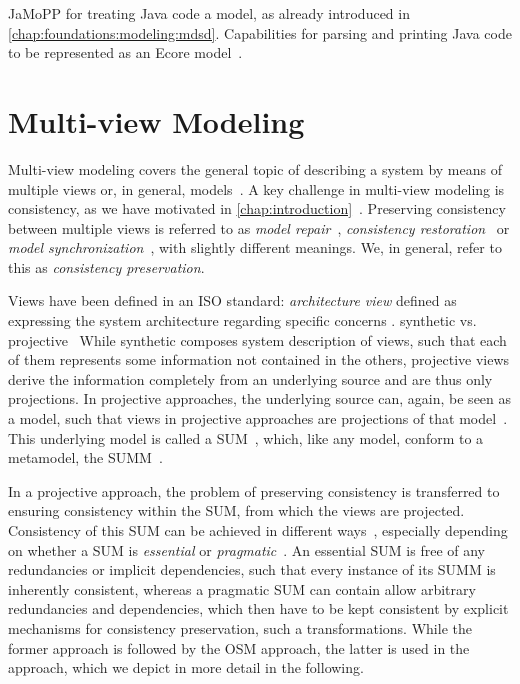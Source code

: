 JaMoPP for treating Java code a model, as already introduced in \autoref{chap:foundations:modeling:mdsd}.
Capabilities for parsing and printing Java code to be represented as an Ecore model~\cite{heidenreich2010jamopp-SLE, heidenreich2009jamopp-report}.


\section{Multi-view Modeling}
\label{chap:foundations:multiview}

Multi-view modeling covers the general topic of describing a system by means of multiple views or, in general, models~\cite{reineke2017ProblemMultiView-SoSym}.
A key challenge in multi-view modeling is consistency, as we have motivated in \autoref{chap:introduction}~\cite{reineke2017ProblemMultiView-SoSym}.
Preserving consistency between multiple views is referred to as \emph{model repair}~\cite{macedo2017ModelRepairClassification-TSE}, \emph{consistency restoration}~\cite{stevens2010sosym, kramer2017a} or \emph{model synchronization}~\cite{diskin2016Taxonomy-JSS}, with slightly different meanings.
We, in general, refer to this as \emph{consistency preservation}.

Views have been defined in an ISO standard: \emph{architecture view} defined as expressing the system architecture regarding specific concerns \cite[p.~2]{iso42010}.
synthetic vs. projective~\cite[p.~22]{iso42010}
While synthetic composes system description of views, such that each of them represents some information not contained in the others, projective views derive the information completely from an underlying source and are thus only projections.
In projective approaches, the underlying source can, again, be seen as a model, such that views in projective approaches are projections of that model~\cite[Fig.~5]{klare2020Vitruv-JSS}.
This underlying model is called a \gls{SUM}~\cite[p.~210]{atkinson2010a}, which, like any model, conform to a metamodel, the \gls{SUMM}~.

In a projective approach, the problem of preserving consistency is transferred to ensuring consistency within the \gls{SUM}, from which the views are projected.
Consistency of this \gls{SUM} can be achieved in different ways~, especially depending on whether a \gls{SUM} is \emph{essential} or \emph{pragmatic}~\cite{atkinson2015realizationMultiView-EDOC}.
An essential \gls{SUM} is free of any redundancies or implicit dependencies, such that every instance of its \gls{SUMM} is inherently consistent, whereas a pragmatic \gls{SUM} can contain allow arbitrary redundancies and dependencies, which then have to be kept consistent by explicit mechanisms for consistency preservation, such a transformations.
While the former approach is followed by the \gls{OSM} approach, the latter is used in the \vitruv approach, which we depict in more detail in the following.


